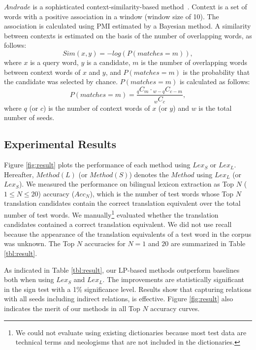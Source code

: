 \documentclass[english]{jnlp_1.4}
\begin{document}
$\mathit{Andrade}$ is a sophisticated context-similarity-based method~\cite{andrade10}. 
Context is a set of words with a positive association in a window (window size of 10). 
The association is calculated using PMI estimated by a Bayesian method. 
A similarity between contexts is estimated on the basis of the number of overlapping words, as follows: 
\begin{equation}
 \mathit{Sim}(x,y) = -\mathit{log}(P(\mathit{matches}=m)),
\end{equation}
where $x$ is a query word, $y$ is a candidate, $m$ is the number of overlapping words between context words of $x$ and $y$, and $P(\mathit{matches}=m)$ is the probability that the candidate was selected by chance. 
$P(\mathit{matches}=m)$ is calculated as follows: 
\begin{equation}
 P(\mathit{matches}=m)=\frac{{}_qC_m \cdot {}_{w-q}C_{c-m}}{{}_wC_c},
\end{equation}
where $q$ (or $c$) is the number of context words of $x$ (or $y$) and $w$ is the total number of seeds. 



\subsection{Experimental Results}

Figure \ref{fig:result} plots the performance of each method using $\mathit{Lex}_{S}$ or $\mathit{Lex}_{L}$. 
Hereafter, $\mathit{Method}(L)$ (or $\mathit{Method}(S)$) denotes the $\mathit{Method}$ using $\mathit{Lex}_{L}$ (or $\mathit{Lex}_{S}$). 
We measured the performance on bilingual lexicon extraction as Top {$N$} ($ 1 \leq N \leq 20 $) accuracy ($\mathit{Acc}_{N}$), which is the number of test words whose Top {$N$} translation candidates contain the correct translation equivalent over the total number of test words. 
We manually\footnote{We could not evaluate using existing dictionaries because most test data are technical terms and neologisms that are not included in the dictionaries.} evaluated whether the translation candidates contained a correct translation equivalent. 
We did not use recall because the appearance of the translation equivalents of a test word in the corpus was unknown. 
The Top $N$ accuracies for $N=1$ and $20$ are summarized in Table \ref{tbl:result}. 

As indicated in Table \ref{tbl:result}, our LP-based methods outperform baselines both when using $\mathit{Lex}_{S}$ and $\mathit{Lex}_{L}$. 
The improvements are statistically significant in the sign test with a 1\% significance level. 
Results show that capturing relations with all seeds including indirect relations, is effective. 
Figure \ref{fig:result} also indicates the merit of our methods in all Top $N$ accuracy curves. 
\end{document}
